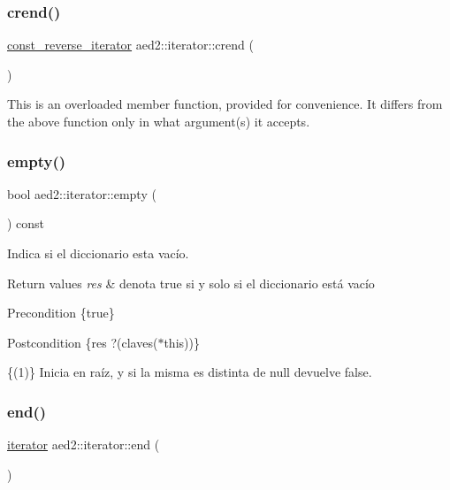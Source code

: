 \subsubsection{\texorpdfstring{crend()}{crend()}}
{\footnotesize\ttfamily \hyperlink{classaed2_1_1iterator_a657402896e5b5966660032f5686cc4c4}{const\+\_\+reverse\+\_\+iterator} aed2\+::iterator\+::crend (\begin{DoxyParamCaption}{ }\end{DoxyParamCaption})\hspace{0.3cm}{\ttfamily [inline]}}

This is an overloaded member function, provided for convenience. It differs from the above function only in what argument(s) it accepts. \mbox{\label{classaed2_1_1iterator_a7f98e1c0896c0d960a9dc020a0a4edb8}} 
\subsubsection{\texorpdfstring{empty()}{empty()}}
{\footnotesize\ttfamily bool aed2\+::iterator\+::empty (\begin{DoxyParamCaption}{ }\end{DoxyParamCaption}) const\hspace{0.3cm}{\ttfamily [inline]}}



Indica si el diccionario esta vacío. 


\begin{DoxyRetVals}{Return values}
{\em res} & denota true si y solo si el diccionario está vacío\\
\hline
\end{DoxyRetVals}
\begin{DoxyPrecond}{Precondition}
\{true\} 
\end{DoxyPrecond}
\begin{DoxyPostcond}{Postcondition}
\{res   ?(claves($\ast$this))\}
\end{DoxyPostcond}
\{(1)\} Inicia en raíz, y si la misma es distinta de null devuelve false. \mbox{\label{classaed2_1_1iterator_a67caf9468be999e9be96b7add5d79946}} 
\subsubsection{\texorpdfstring{end()}{end()}\hspace{0.1cm}{\footnotesize\ttfamily [1/2]}}
{\footnotesize\ttfamily \hyperlink{classaed2_1_1iterator_1_1iterator}{iterator} aed2\+::iterator\+::end (\begin{DoxyParamCaption}{ }\end{DoxyParamCaption})\hspace{0.3cm}{\ttfamily [inline]}}



